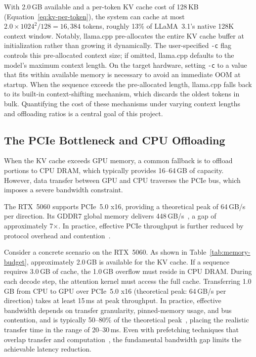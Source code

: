 \documentclass[
english,                 %
bibtex,                  %
]{kththesis}
\numberwithin{listing}{chapter}
\begin{document}
With 2.0\,GB available and a per-token \gls{KV} cache cost of 128\,KB (Equation~\ref{eq:kv-per-token}), the system can cache at most $2.0 \times 1024^2 / 128 = 16{,}384$ tokens, roughly 13\% of LLaMA~3.1's native 128K context window. Notably, llama.cpp pre-allocates the entire \gls{KV} cache buffer at initialization rather than growing it dynamically. The user-specified \texttt{-c} flag controls this pre-allocated context size; if omitted, llama.cpp defaults to the model's maximum context length. On the target hardware, setting \texttt{-c} to a value that fits within available memory is necessary to avoid an immediate \gls{OOM} at startup. When the sequence exceeds the pre-allocated length, llama.cpp falls back to its built-in context-shifting mechanism, which discards the oldest tokens in bulk. Quantifying the cost of these mechanisms under varying context lengths and offloading ratios is a central goal of this project.


\subsection{The PCIe Bottleneck and CPU Offloading}
\label{sec:bg-pcie}

When the \gls{KV} cache exceeds \gls{GPU} memory, a common fallback is to offload portions to \gls{CPU} \gls{DRAM}, which typically provides 16--64\,GB of capacity. However, data transfer between \gls{GPU} and \gls{CPU} traverses the PCIe bus, which imposes a severe bandwidth constraint.

The RTX~5060 supports PCIe~5.0 x16, providing a theoretical peak of 64\,GB/s per direction. Its GDDR7 global memory delivers 448\,GB/s~\cite{nvidia2025rtx50series}, a gap of approximately 7$\times$. In practice, effective PCIe throughput is further reduced by protocol overhead and contention~\cite{sheng2023flexgen}.

Consider a concrete scenario on the RTX~5060. As shown in Table~\ref{tab:memory-budget}, approximately 2.0\,GB is available for the \gls{KV} cache. If a sequence requires 3.0\,GB of cache, the 1.0\,GB overflow must reside in \gls{CPU} DRAM. During each decode step, the attention kernel must access the full cache. Transferring 1.0\,GB from \gls{CPU} to \gls{GPU} over PCIe~5.0 x16 (theoretical peak: 64\,GB/s per direction) takes at least 15\,ms at peak throughput. In practice, effective bandwidth depends on transfer granularity, pinned-memory usage, and bus contention, and is typically 50--80\% of the theoretical peak~\cite{sheng2023flexgen}, placing the realistic transfer time in the range of 20--30\,ms. Even with prefetching techniques that overlap transfer and computation~\cite{lee2024infinigen}, the fundamental bandwidth gap limits the achievable latency reduction.
\end{document}
